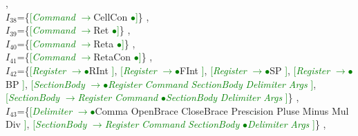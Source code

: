 \documentclass[a0]{a0poster}
\begin{document}
,\\
$I_{38}$=\{\textcolor{Green}{[}\textcolor{Green}{\textit{Command}} \textcolor{Green}{$\to$}CellCon \textcolor{Green}{$\bullet$}\textcolor{Green}{]}\}
,\\
$I_{39}$=\{\textcolor{Green}{[}\textcolor{Green}{\textit{Command}} \textcolor{Green}{$\to$}Ret \textcolor{Green}{$\bullet$}\textcolor{Green}{]}\}
,\\
$I_{40}$=\{\textcolor{Green}{[}\textcolor{Green}{\textit{Command}} \textcolor{Green}{$\to$}Reta \textcolor{Green}{$\bullet$}\textcolor{Green}{]}\}
,\\
$I_{41}$=\{\textcolor{Green}{[}\textcolor{Green}{\textit{Command}} \textcolor{Green}{$\to$}RetaCon \textcolor{Green}{$\bullet$}\textcolor{Green}{]}\}
,\\
$I_{42}$=\{\textcolor{Green}{[}\textcolor{Green}{\textit{Register}} \textcolor{Green}{$\to$}\textcolor{Green}{$\bullet$}RInt \textcolor{Green}{]}, \textcolor{Green}{[}\textcolor{Green}{\textit{Register}} \textcolor{Green}{$\to$}\textcolor{Green}{$\bullet$}FInt \textcolor{Green}{]}, \textcolor{Green}{[}\textcolor{Green}{\textit{Register}} \textcolor{Green}{$\to$}\textcolor{Green}{$\bullet$}SP \textcolor{Green}{]}, \textcolor{Green}{[}\textcolor{Green}{\textit{Register}} \textcolor{Green}{$\to$}\textcolor{Green}{$\bullet$}BP \textcolor{Green}{]}, \textcolor{Green}{[}\textcolor{Green}{\textit{SectionBody}} \textcolor{Green}{$\to$}\textcolor{Green}{$\bullet$}\textcolor{Green}{\textit{Register}} \textcolor{Green}{\textit{Command}} \textcolor{Green}{\textit{SectionBody}} \textcolor{Green}{\textit{Delimiter}} \textcolor{Green}{\textit{Args}} \textcolor{Green}{]}, \textcolor{Green}{[}\textcolor{Green}{\textit{SectionBody}} \textcolor{Green}{$\to$}\textcolor{Green}{\textit{Register}} \textcolor{Green}{\textit{Command}} \textcolor{Green}{$\bullet$}\textcolor{Green}{\textit{SectionBody}} \textcolor{Green}{\textit{Delimiter}} \textcolor{Green}{\textit{Args}} \textcolor{Green}{]}\}
,\\
$I_{43}$=\{\textcolor{Green}{[}\textcolor{Green}{\textit{Delimiter}} \textcolor{Green}{$\to$}\textcolor{Green}{$\bullet$}Comma OpenBrace CloseBrace Prescision Pluse Minus Mul Div \textcolor{Green}{]}, \textcolor{Green}{[}\textcolor{Green}{\textit{SectionBody}} \textcolor{Green}{$\to$}\textcolor{Green}{\textit{Register}} \textcolor{Green}{\textit{Command}} \textcolor{Green}{\textit{SectionBody}} \textcolor{Green}{$\bullet$}\textcolor{Green}{\textit{Delimiter}} \textcolor{Green}{\textit{Args}} \textcolor{Green}{]}\}
,\\
\end{document}
